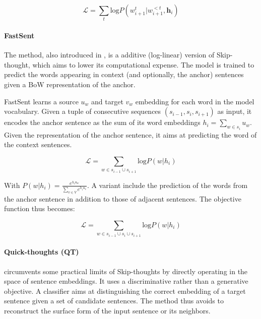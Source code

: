 \begin{equation*}
    \mathcal{L} = \sum_t \text{log} P(w_{i+1}^t | w_{i+1}^{<t}, \textbf{h}_i)
\end{equation*}

\paragraph{FastSent} The method, also introduced in \textcite{hill_16}, is a additive (log-linear) version of Skip-thought, which aims to lower its computational expense. The model is trained to predict the words appearing in context (and optionally, the anchor) sentences given a BoW representation of the anchor. 

FastSent learns a source $u_w$ and target $v_w$ embedding for each word in the model vocabulary. Given a tuple of consecutive sequences $(s_{i-1}, s_i, s_{i+1})$ as input, it encodes the anchor sentence as the sum of its word embeddings $h_i = \sum_{w \in s_i}u_w$. Given the representation of the anchor sentence, it aims at predicting the word of the context sentences. 

\begin{equation*}
    \mathcal{L} = \sum_{w \in s_{i-1} \cup s_{i+1}} \text{log} P(w | h_i)
\end{equation*}

With $P(w | h_i) = \frac{e^{h_i u_w}}{\sum_{v \in V}e^{h_i u_v}}$. A variant include the prediction of the words from the anchor sentence in addition to those of adjacent sentences. The objective function thus becomes:

\begin{equation*}
    \mathcal{L} = \sum_{w \in s_{i-1} \cup s_{i} \cup s_{i+1}} \text{log} P(w | h_i)
\end{equation*}

\paragraph{Quick-thoughts (QT)} \textcite{logeswaran_18} circumvents some practical limits of Skip-thoughts by directly operating in the space of sentence embeddings. It uses a discriminative rather than a generative objective. A classifier aims at distinguishing the correct embedding of a target sentence given a set of candidate sentences. The method thus avoids to reconstruct the surface form of the input sentence or its neighbors.

